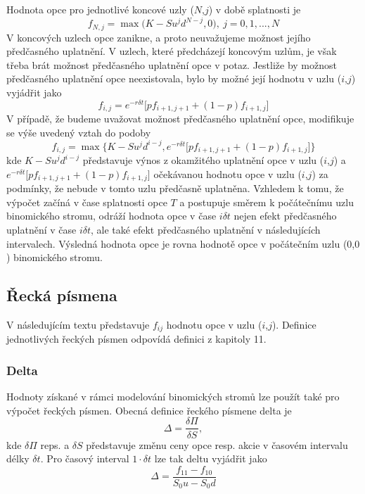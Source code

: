 \documentclass[a4paper]{book}
\begin{document}
Hodnota opce pro jednotlivé koncové uzly ($N$,$j$) v době splatnosti je
\begin{equation*}
f_{N,j} = \max \big( K - Su^jd^{N-j},0 \big),~j=0, 1, ...,N 
\end{equation*}
V koncových uzlech opce zanikne, a proto neuvažujeme možnost jejího předčasného uplatnění. V uzlech, které předcházejí koncovým uzlům, je však třeba brát možnost předčasného uplatnění opce v potaz. Jestliže by možnost předčasného uplatnění opce neexistovala, bylo by možné její hodnotu v uzlu ($i$,$j$) vyjádřit jako
\begin{equation*}
f_{i,j}=e^{-r \delta t} \big[pf_{i+1,j+1} + (1-p)f_{i+1,j} \big]
\end{equation*}
V případě, že budeme uvažovat možnost předčasného uplatnění opce, modifikuje se výše uvedený vztah do podoby
\begin{equation*}
f_{i,j} = \max \big\{ K - Su^jd^{i-j},e^{-r \delta t} \big[pf_{i+1,j+1}+(1-p)f_{i+1,j} \big]\big\}
\end{equation*}
kde $ K - Su^jd^{i-j}$ představuje výnos z okamžitého uplatnění opce v uzlu ($i$,$j$) a $e^{-r \delta t} \big[pf_{i+1,j+1}+(1-p)f_{i+1,j} \big]$ očekávanou hodnotu opce v uzlu ($i$,$j$) za podmínky, že nebude v tomto uzlu předčasně uplatněna. Vzhledem k tomu, že výpočet začíná v čase splatnosti opce $T$ a postupuje směrem k počátečnímu uzlu binomického stromu, odráží hodnota opce v čase $i \delta t$ nejen efekt předčasného uplatnění v čase $i \delta t$, ale také efekt předčasného uplatnění v následujících intervalech. Výsledná hodnota opce je rovna hodnotě opce v počátečním uzlu ($0$,$0$) binomického stromu.

\subsection{Řecká písmena}

V následujícím textu představuje $f_{ij}$ hodnotu opce v uzlu ($i$,$j$). Definice jednotlivých řeckých písmen odpovídá definici z kapitoly 11.

\subsubsection{Delta}

Hodnoty získané v rámci modelování binomických stromů lze použít také pro výpočet řeckých písmen. Obecná definice řeckého písmene delta je
\begin{equation*}
\Delta = \frac{\delta \Pi}{\delta S},
\end{equation*}
kde $\delta \Pi$ reps. a $\delta S$ představuje změnu ceny opce resp. akcie v časovém intervalu délky $\delta t$. Pro časový interval $1 \cdot \delta t$ lze tak deltu vyjádřit jako
\begin{equation*}
\Delta = \frac{f_{11}-f_{10}}{S_0u - S_0d}
\end{equation*}
\end{document}
